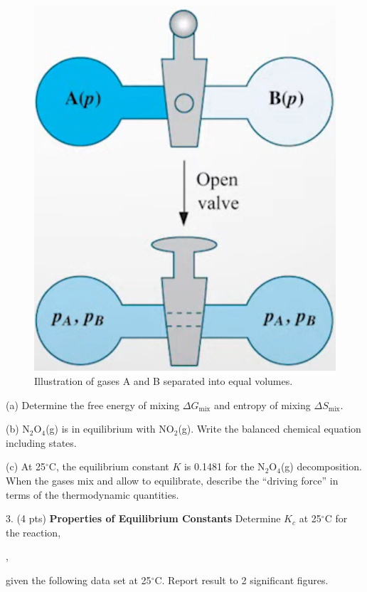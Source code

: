 \documentclass[11pt]{article}
\begin{document}
\begin{figure}[hbpt]
  \centering
  \includegraphics[scale=0.25]{mix_ideal.png}
  \caption{Illustration of gases A and B separated into equal volumes.}
  \label{fig:mix}
\end{figure}

(a) Determine the free energy of mixing $\Delta G_\text{mix}$ and entropy
of mixing $\Delta S_\text{mix}$.

(b) N$_2$O$_4$(g) is in equilibrium with NO$_2$(g). Write the balanced
chemical equation including states.

(c) At 25$^\circ$C, the equilibrium constant $K$ is 0.1481 for the N$_2$O$_4$(g)
decomposition. When the gases mix and allow to equilibrate, describe the ``driving
force'' in terms of the thermodynamic quantities.


\pagebreak

3. (4 pts) \textbf{Properties of Equilibrium Constants} Determine $K_c$ at 25$^\circ$C
for the reaction,
\begin{center}
  ,
\end{center}
given the following data set at 25$^\circ$C. Report result to 2 significant figures.
\begin{center}


\end{center}

\pagebreak
\end{document}
